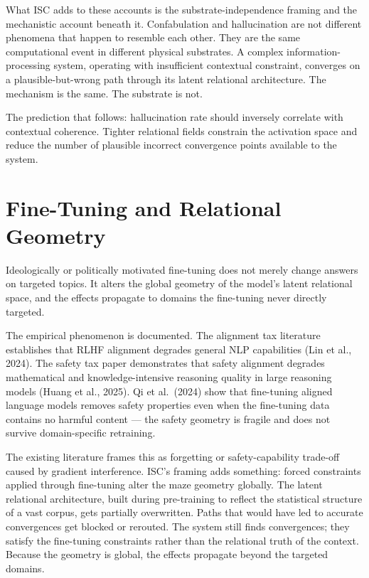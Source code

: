 \documentclass[12pt]{article}
\begin{document}
What ISC adds to these accounts is the substrate-independence framing
and the mechanistic account beneath it. Confabulation and hallucination
are not different phenomena that happen to resemble each other. They are
the same computational event in different physical substrates. A complex
information-processing system, operating with insufficient contextual
constraint, converges on a plausible-but-wrong path through its latent
relational architecture. The mechanism is the same. The substrate is
not.

The prediction that follows: hallucination rate should inversely
correlate with contextual coherence. Tighter relational fields constrain
the activation space and reduce the number of plausible incorrect
convergence points available to the system.

\section{Fine-Tuning and Relational
Geometry}\label{fine-tuning-and-relational-geometry}

Ideologically or politically motivated fine-tuning does not merely
change answers on targeted topics. It alters the global geometry of the
model's latent relational space, and the effects propagate to domains
the fine-tuning never directly targeted.

The empirical phenomenon is documented. The alignment tax literature
establishes that RLHF alignment degrades general NLP capabilities (Lin
et al., 2024). The safety tax paper demonstrates that safety alignment
degrades mathematical and knowledge-intensive reasoning quality in large
reasoning models (Huang et al., 2025). Qi et al.~(2024) show that
fine-tuning aligned language models removes safety properties even when
the fine-tuning data contains no harmful content --- the safety geometry
is fragile and does not survive domain-specific retraining.

The existing literature frames this as forgetting or safety-capability
trade-off caused by gradient interference. ISC's framing adds something:
forced constraints applied through fine-tuning alter the maze geometry
globally. The latent relational architecture, built during pre-training
to reflect the statistical structure of a vast corpus, gets partially
overwritten. Paths that would have led to accurate convergences get
blocked or rerouted. The system still finds convergences; they satisfy
the fine-tuning constraints rather than the relational truth of the
context. Because the geometry is global, the effects propagate beyond
the targeted domains.
\end{document}
